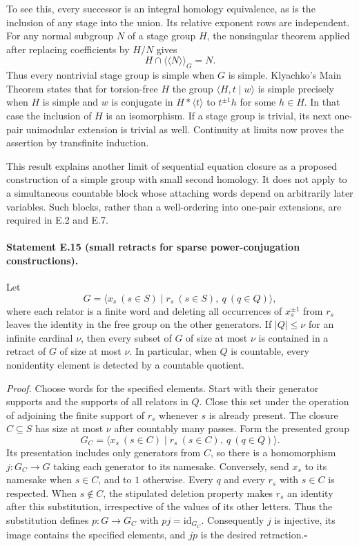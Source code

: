 To see this, every successor is an integral homology equivalence,
as is the inclusion of any stage into the union. Its relative
exponent rows are independent. For any normal subgroup $N$ of a
stage group $H$, the nonsingular theorem applied after replacing
coefficients by $H/N$ gives
\[
 H\cap\langle\!\langle N\rangle\!\rangle_G=N.
\]
Thus every nontrivial stage group is simple when $G$ is simple.
Klyachko's Main Theorem \cite{EKlyachkoSimple2005} states that
for torsion-free $H$ the group $\langle H,t\mid w\rangle$ is
simple precisely when $H$ is simple and $w$ is conjugate in
$H*\langle t\rangle$ to $t^{\pm1}h$ for some $h\in H$.
In that case the inclusion of $H$ is an isomorphism.
If a stage group is trivial, its next one-pair unimodular
extension is trivial as well. Continuity at limits now proves
the assertion by transfinite induction.

This result explains another limit of sequential equation
closure as a proposed construction of a simple group with small
second homology. It does not apply to a simultaneous countable
block whose attaching words depend on arbitrarily later
variables. Such blocks, rather than a well-ordering into
one-pair extensions, are required in E.2 and E.7.

\paragraph{Statement E.15 (small retracts for sparse power-conjugation constructions).}
Let
\[
 G=\langle x_s\ (s\in S)\mid r_s\ (s\in S),\ q\ (q\in Q)\rangle,
\]
where each relator is a finite word and deleting all occurrences
of $x_s^{\pm1}$ from $r_s$ leaves the identity in the free group
on the other generators. If $|Q|\leq\nu$ for an infinite cardinal
$\nu$, then every subset of $G$ of size at most $\nu$ is contained
in a retract of $G$ of size at most $\nu$. In particular, when
$Q$ is countable, every nonidentity element is detected by a
countable quotient.

\emph{Proof.}
Choose words for the specified elements. Start with their
generator supports and the supports of all relators in $Q$.
Close this set under the operation of adjoining the finite
support of $r_s$ whenever $s$ is already present. The closure
$C\subseteq S$ has size at most $\nu$ after countably many
passes. Form the presented group
\[
 G_C=\langle x_s\ (s\in C)\mid r_s\ (s\in C),\ q\ (q\in Q)\rangle.
\]
Its presentation includes only generators from $C$, so there is
a homomorphism $j:G_C\to G$ taking each generator to its namesake.
Conversely, send $x_s$ to its namesake when $s\in C$, and to $1$
otherwise. Every $q$ and every $r_s$ with $s\in C$ is respected.
When $s\notin C$, the stipulated deletion property makes $r_s$
an identity after this substitution, irrespective of the values
of its other letters. Thus the substitution defines
$p:G\to G_C$ with $pj=\mathrm{id}_{G_C}$.
Consequently $j$ is injective, its image contains the specified
elements, and $jp$ is the desired retraction.\hfill$\square$

